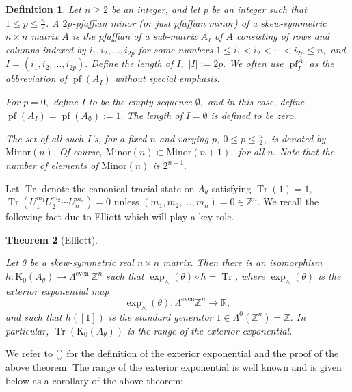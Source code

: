 \documentclass[9pt, BCOR=2mm]{amsart}
\numberwithin{equation}{section}
\numberwithin{equation}{section}
\newtheorem{theorem}{Theorem}[section]
\newtheorem{definition}[theorem]{Definition}
\newcommand{\Z}{{\mathbb{Z}}}
\newcommand{\R}{{\mathbb{R}}}
\newcommand{\pf}{{\operatorname{pf}}}
\newcommand{\K}{\mathrm{K}} %
\DeclareMathOperator{\Tr}{Tr}
\newcommand{\m}[2]{\ensuremath{{#1}_{#2}}}
\begin{document}
\begin{definition}\label{2p minor}Let $n\geq 2$ be an integer, and let $p$ be an integer such that $1\leq p\leq\frac{n}{2}.$ A {\it $2p$-pfaffian minor} (or just {\it pfaffian minor}) of a skew-symmetric $n\times n$ matrix $A$ is the pfaffian of a sub-matrix $\m{A}{I}$ of $A$ consisting of rows and columns indexed by $i_1,i_2,\dots,i_{2p}$ for some numbers
  $1\leq i_1<i_2<\cdots<i_{2p}\leq n,$ and $I=(i_1,i_2,\dots,i_{2p}).$ Define the length of $I,$ $|I|:=2p.$ We often use ${\pf}_{I}^A$
  as the abbreviation of ${\pf}(\m{A}{I})$ without special emphasis.
  
  For $p=0,$ define $I$ to be the empty sequence $\emptyset,$ and in this case, define  ${\pf}(\m{A}{I})={\pf}(\m{A}{\emptyset}):=1.$ The length of $I=\emptyset$ is defined to be zero. 
  
  The set of all such $I$'s, for a fixed $n$ and varying $p,~ 0\leq p\leq\frac{n}{2},$ is denoted by $\mathrm{Minor}(n).$ Of course, $\mathrm{Minor}(n)\subset \mathrm{Minor}(n+1),$ for all $n.$ Note that the number of elements of $\mathrm{Minor}(n)$ is $2^{n-1}.$
\end{definition}

Let $\Tr$ denote the canonical tracial state on $A_\theta$ satisfying $\Tr(1)=1,$  $\Tr(U_1^{m_1}U_2^{m_2}\cdots U_n^{m_n})=0$ unless $(m_1,m_2,\ldots,m_n)=0\in \Z^n.$ We recall the following fact due to Elliott which will play a key role.
\begin{theorem}[Elliott]\label{elliott_image_of_trace}

Let $\theta$ be a skew-symmetric real $n\times n$ matrix. Then there is an isomorphism $h: \K_0\left(A_{\theta}\right) \rightarrow \Lambda^{\text {even }} \mathbb{Z}^n$ such that $\exp _{\wedge}(\theta) \circ h=\Tr$, where $\operatorname{exp}_{\wedge}(\theta)$ is the exterior exponential map
 $$\operatorname{exp}_{\wedge}(\theta):\Lambda^{\operatorname{even}}\Z^n\rightarrow \R,$$and such that $h([1])$ is the standard generator $1 \in \Lambda^0\left(\mathbb{Z}^n\right)=\mathbb{Z}$. In particular, $\Tr(\K_0(A_\theta))$  is the range of the exterior exponential.
\end{theorem}
 \noindent We refer to (\cite[(1.3, Theorem 2.2, Theorem 3.1)]{Ell84}) for the definition of the exterior exponential and the proof of the above theorem. The range of the exterior exponential is well known and is given below as a corollary of the above theorem:
\end{document}

